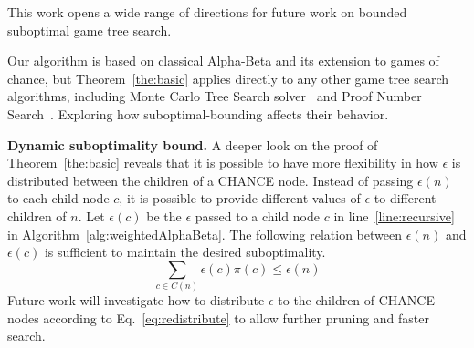 \documentclass[runningheads]{llncs}
\newcommand{\MM}{\mathit{V}}
\newcommand{\pess}{\mathit{L}}
\newcommand{\opti}{\mathit{U}}
\newcommand{\rootnode}{\mathit{n_1}}
\begin{document}
This work opens a wide range of directions for future work on bounded suboptimal game tree search. 

 Our algorithm is based on classical Alpha-Beta and its extension to games of chance, but Theorem~\ref{the:basic} applies directly to any other game tree search algorithms, including Monte Carlo Tree Search solver~\citep{lanctot2013monte} and Proof Number Search~\citep{allis1994proof}. Exploring how suboptimal-bounding affects their behavior. 


\noindent \textbf{Dynamic suboptimality bound.}
A deeper look on the proof of Theorem~\ref{the:basic} reveals that it is possible to have more flexibility in how $\epsilon$ is distributed between the children of a CHANCE node. Instead of passing $\epsilon(n)$ to each child node $c$, it is possible to provide different values of $\epsilon$ to different children of $n$. 
Let $\epsilon(c)$ be the $\epsilon$ passed to a child node $c$ in line~\ref{line:recursive} in Algorithm~\ref{alg:weightedAlphaBeta}. The following relation between $\epsilon(n)$ and $\epsilon(c)$ is sufficient to maintain the desired suboptimality. 
\begin{equation}
  \sum_{c\in C(n)} \epsilon(c) \pi(c) \leq \epsilon(n) \label{eq:redistribute}
\end{equation}
Future work will investigate how to distribute  $\epsilon$ to the children of CHANCE nodes according to Eq.~\eqref{eq:redistribute} to allow further pruning and faster search. 
\end{document}

